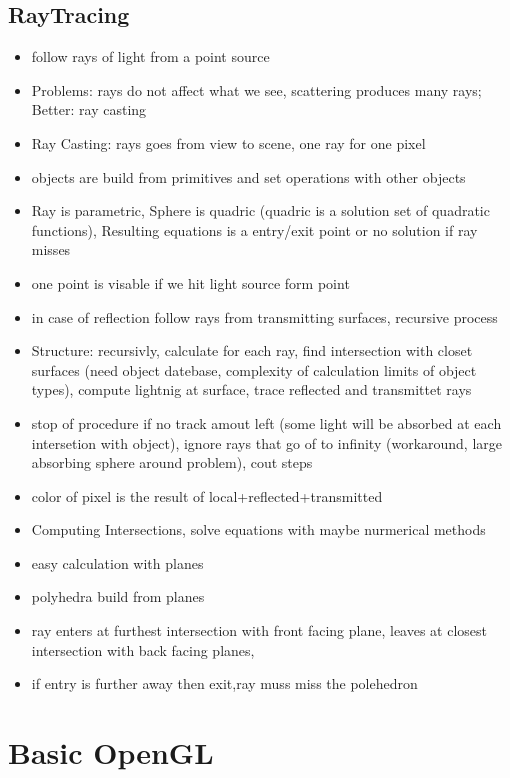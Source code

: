 \documentclass[11pt,a4paper]{article}
\begin{document}
	\subsection{RayTracing}
		\begin{itemize}
			\item follow rays of light from a point source
			\item Problems: rays do not affect what we see, scattering produces many rays; Better: ray casting
			\item Ray Casting: rays goes from view to scene, one ray for one pixel
			\item objects are build from primitives and set operations with other objects
			\item Ray is parametric, Sphere is quadric (quadric is a solution set of quadratic functions), Resulting equations is a entry/exit point or no solution if ray misses
			\item one point is visable if we hit light source form point
			\item in case of reflection follow rays from transmitting surfaces, recursive process
			\item Structure: recursivly, calculate for each ray, find intersection with closet surfaces (need object datebase, complexity of calculation limits of object types), compute lightnig at surface, trace reflected and transmittet rays
			\item stop of procedure if no track amout left (some light will be absorbed at each intersetion with object), ignore rays that go of to infinity (workaround, large absorbing sphere around problem), cout steps
			\item color of pixel is the result of local+reflected+transmitted
			\item Computing Intersections, solve equations with maybe nurmerical methods 
			\item easy calculation with planes
			\item polyhedra build from planes
			\item ray enters at furthest intersection with front facing plane, leaves at closest intersection with back facing planes,
			\item if entry is further away then exit,ray muss miss the polehedron
		\end{itemize}

\section{Basic OpenGL}
\end{document}
